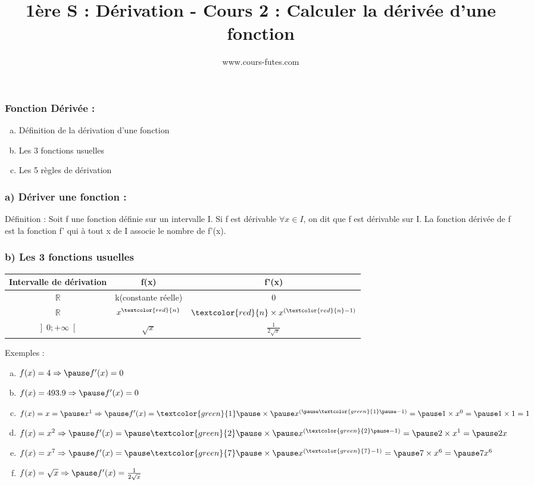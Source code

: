 \documentclass[t]{beamer}
\title{1ère S : Dérivation - Cours 2 : Calculer la dérivée d'une fonction}
\author{www.cours-futes.com}
\institute{Sébastien Harinck}
\date{}
\begin{document}
\begin{frame}
\titlepage
\end{frame}

\begin{frame}[label=pagebanale]
\frametitle{Fonction Dérivée :}
\pause
\begin{enumerate}[a)]
\item<+-> Définition de la dérivation d'une fonction
\item<+-> Les 3 fonctions usuelles
\item<+-> Les 5 règles de dérivation
\end{enumerate}
\end{frame}

\begin{frame}[label=pagebanale]
\frametitle{a) Dériver une fonction : }
\pause
\begin{block}{Définition :}
\pause
Soit f une fonction définie sur un intervalle I. \pause Si f est dérivable $\forall x \in I$, \pause on dit que f est dérivable sur I. \pause La fonction dérivée de f est la fonction f' qui à tout x de I \pause associe le nombre de f'(x).
\pause
\end{block}
\end{frame}

\begin{frame}[label=pagebanale]
\frametitle{b) Les 3 fonctions usuelles}
\pause
\begin{tabular}{|c|c|c|}
	\hline
		\textbf{Intervalle de dérivation} & \textbf{f(x)} & \textbf{f'(x)} \\
	\hline
		$\mathbb{R}$ & k(constante réelle) & 0 \\
	\hline
		$\mathbb{R}$ & $x^{\textcolor{red}{n}}$ & $\textcolor{red}{n} \times x^{(\textcolor{red}{n}-1)} $ \\
	\hline
		$\left] 0;+ \infty \right[ $ & $\sqrt{x}$ & $\frac{1}{2 \sqrt{x}}$ \\
	\hline 
\end{tabular}
\pause
\begin{block}{Exemples : }
\pause
\begin{enumerate}[a)]
\item $ f(x)=4 \Rightarrow \pause f'(x)= 0 $
\pause
\item $ f(x)=493.9 \Rightarrow \pause f'(x)= 0 $
\pause
\item $ f(x)=x = \pause x^1 \Rightarrow \pause f'(x)= \textcolor{green}{1} \pause \times \pause x^{(\pause \textcolor{green}{1} \pause-1)} = \pause 1 \times x^0 = \pause 1 \times 1 = 1 $
\pause
\item $ f(x)=x^2 \Rightarrow \pause f'(x)= \pause \textcolor{green}{2} \pause \times \pause x^{(\textcolor{green}{2} \pause -1)} = \pause 2 \times x^1 = \pause 2x $
\pause
\item $ f(x)=x^7 \Rightarrow \pause f'(x)= \pause \textcolor{green}{7} \pause \times \pause x^{(\textcolor{green}{7}-1)} = \pause 7 \times x^6 = \pause 7x^6 $
\pause
\item $ f(x)=\sqrt{x} \Rightarrow \pause f'(x)= \frac{1}{2 \sqrt{x}}  $
\pause
\end{enumerate}
\end{block}
\end{frame}
\end{document}
